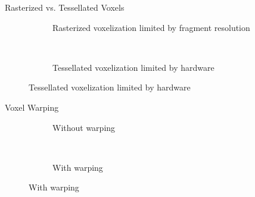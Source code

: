 \documentclass[10pt]{beamer}
\begin{document}
\begin{frame}{Rasterized vs. Tessellated Voxels}
  \begin{figure}
    \begin{subfigure}[t]{0.475\textwidth}
      \caption*{Rasterized voxelization limited by fragment resolution}
    \end{subfigure}
    ~
    \begin{subfigure}[t]{0.475\textwidth}
      \caption*{Tessellated voxelization limited by hardware}
    \end{subfigure}
  \end{figure}
\end{frame}


\begin{frame}{Voxel Warping}
  \begin{figure}
    \begin{subfigure}[t]{0.475\textwidth}
      \caption*{Without warping}
    \end{subfigure}
    ~
    \begin{subfigure}[t]{0.475\textwidth}
      \caption*{With warping}
    \end{subfigure}
  \end{figure}
\end{frame}
\end{document}
